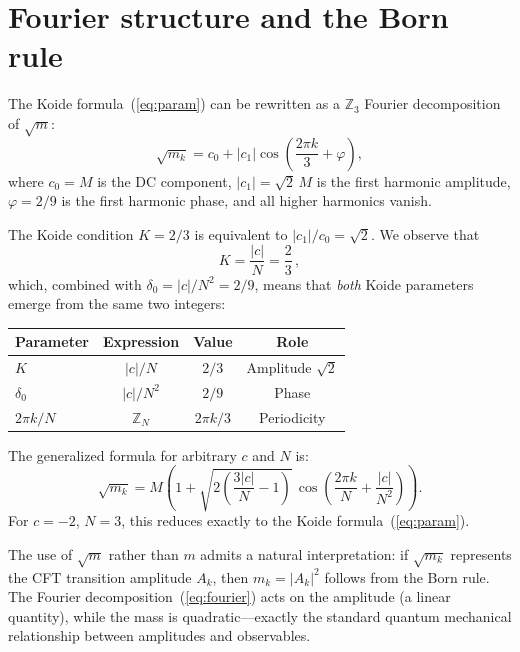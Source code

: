 \documentclass[aps,prl,twocolumn,superscriptaddress]{revtex4-2}
\begin{document}
\section{Fourier structure and the Born rule}

The Koide formula~(\ref{eq:param}) can be rewritten as a $\mathbb{Z}_3$ Fourier
decomposition of $\sqrt{m}$:
\begin{equation}
\sqrt{m_k} = c_0 + |c_1|\cos\!\left(\frac{2\pi k}{3} + \varphi\right),
\label{eq:fourier}
\end{equation}
where $c_0 = M$ is the DC component, $|c_1| = \sqrt{2}\,M$ is the first harmonic
amplitude, $\varphi = 2/9$ is the first harmonic phase, and all higher harmonics vanish.

The Koide condition $K = 2/3$ is equivalent to $|c_1|/c_0 = \sqrt{2}$. We observe that
\begin{equation}
K = \frac{|c|}{N} = \frac{2}{3}\,,
\label{eq:Kvalue}
\end{equation}
which, combined with $\delta_0 = |c|/N^2 = 2/9$, means that \emph{both} Koide parameters
emerge from the same two integers:

\begin{center}
\begin{tabular}{lccc}
\hline\hline
Parameter & Expression & Value & Role \\
\hline
$K$ & $|c|/N$ & $2/3$ & Amplitude $\sqrt{2}$ \\
$\delta_0$ & $|c|/N^2$ & $2/9$ & Phase \\
$2\pi k/N$ & $\mathbb{Z}_N$ & $2\pi k/3$ & Periodicity \\
\hline\hline
\end{tabular}
\end{center}

The generalized formula for arbitrary $c$ and $N$ is:
\begin{equation}
\sqrt{m_k} = M\!\left(1 + \sqrt{2\!\left(\frac{3|c|}{N} - 1\right)}\,
\cos\!\left(\frac{2\pi k}{N} + \frac{|c|}{N^2}\right)\right).
\label{eq:general}
\end{equation}
For $c = -2$, $N = 3$, this reduces exactly to the Koide formula~(\ref{eq:param}).

The use of $\sqrt{m}$ rather than $m$ admits a natural interpretation: if $\sqrt{m_k}$
represents the CFT transition amplitude $A_k$, then $m_k = |A_k|^2$ follows from the
Born rule. The Fourier decomposition~(\ref{eq:fourier}) acts on the amplitude (a linear
quantity), while the mass is quadratic---exactly the standard quantum mechanical
relationship between amplitudes and observables.
\end{document}
